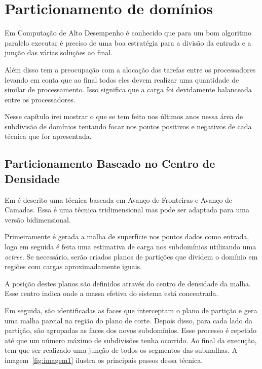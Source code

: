 \pagestyle{empty}
\cleardoublepage
\pagestyle{fancy}
\chapter{Particionamento de domínios}\label{cap2}

Em Computação de Alto Desempenho é conhecido que para um bom algoritmo paralelo executar é preciso de uma boa estratégia para a divisão da entrada e a junção das várias soluções ao final. 

Além disso tem a preocupação com a alocação das tarefas entre os processadores levando em conta que ao final todos eles devem realizar uma quantidade de similar de processamento. Isso significa que a carga foi devidamente balanceada entre os processadores.

Nesse capítulo irei mostrar o que se tem feito nos últimos anos nessa área de subdivisão de domínios tentando focar nos pontos positivos e negativos de cada técnica que for apresentada.


\section{Particionamento Baseado no Centro de Densidade}

Em \cite{bib:Pirzadeh09} é descrito uma técnica baseada em Avanço de Fronteiras e Avanço de Camadas. Essa é uma técnica tridimensional mas pode ser adaptada para uma versão bidimensional.

Primeiramente é gerada a malha de superfície nos pontos dados como entrada, logo em seguida é feita uma estimativa de carga nos subdomínios utilizando uma \textit{octree}. Se necessário, serão criados planos de partições que dividem o domínio em regiões com cargas aproximadamente iguais. 

A posição destes planos são definidos através do centro de densidade da malha. Esse centro indica onde a massa efetiva do sistema está concentrada.

Em seguida, são identificadas as faces que interceptam o plano de partição e gera uma malha parcial na região do plano de corte. Depois disso, para cada lado da partição, são agrupadas as faces dos novos subdomínios. Esse processo é repetido até que um número máximo de subdivisões tenha ocorrido. Ao final da execução, tem que ser realizado uma junção de todos os segmentos das submalhas. A imagem~\ref{fig:imagem1} ilustra os principais passos dessa técnica.

